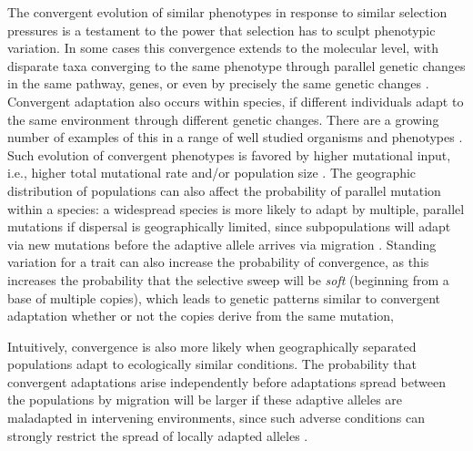 \documentclass[10pt,letterpaper]{article}
\newcommand{\citep}[1]{\cite{#1}}
\begin{document}
The convergent evolution of similar phenotypes 
in response to similar selection pressures is a testament to the power that selection 
has to sculpt phenotypic variation. 
In some cases this convergence extends to the molecular level, 
with disparate taxa converging to the same phenotype through parallel 
genetic changes in the same pathway, genes, 
or even by precisely the same genetic changes
\citep{stern2013genetic,zhen2012parallel,martin2013repeated}. 
Convergent adaptation also occurs within species, if different individuals
adapt to the same environment through different genetic changes. 
There are a growing number of examples of this in a range of well studied organisms and phenotypes \citep{Arendt:08}.
Such evolution of convergent phenotypes is favored by higher mutational input, 
i.e., higher total mutational rate and/or population size \citep{softsweepsII}.
The geographic distribution of populations can also affect the probability of parallel mutation within a species:
a widespread species is more likely to adapt by multiple, parallel mutations if dispersal is geographically limited, 
since subpopulations will adapt via new mutations before the adaptive allele arrives via migration \citep{ralph2010parallel}. 
Standing variation for a trait can also increase the probability of convergence, 
as this increases the probability that the selective sweep will be \emph{soft}
(beginning from a base of multiple copies),
which 
leads to genetic patterns similar to convergent adaptation \citep{orr2001sieve,softsweepsI}
whether or not the copies derive from the same mutation,

Intuitively, convergence is also more likely 
when geographically separated populations adapt to ecologically similar conditions. 
The probability that convergent adaptations arise independently
before adaptations spread between the populations by migration
will be larger if these adaptive alleles are maladapted in intervening environments,
since such adverse conditions can strongly restrict the spread of locally adapted alleles \citep{slatkin1973geneflow}.
 
\end{document}
